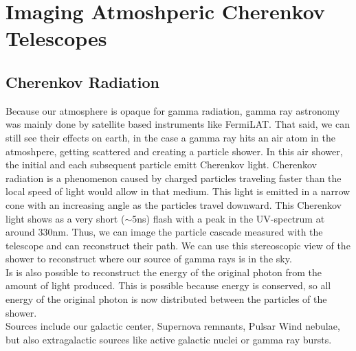 \documentclass[12pt,article,type=msc,colorback,accentcolor=tud9c]{tudthesis}
\begin{document}
\clearpage
\section{\Large Imaging Atmoshperic Cherenkov Telescopes}
\subsection{Cherenkov Radiation}

\begin{wrapfigure}{R}{0.4\textwidth}
\centering
\texttt{[image: D:/OwnCloudData/00\_WriteUP/04\_Thesis/Pic/Proposal/Fig/\{gamma]}.jpg}
\caption{\label{fig:Cherenkov} The cone of Cherenkov light emitted by an extensive air shower}
\end{wrapfigure}

Because  our atmosphere is opaque for gamma radiation, gamma ray astronomy was mainly done by satellite based instruments like FermiLAT.
That said, we can still see their effects on earth, in the case a gamma ray hits an air atom in the atmoshpere, getting scattered and creating a particle shower. In this air shower, the initial and each subsequent particle emitt Cherenkov light. Cherenkov radiation is a phenomenon caused by charged particles traveling faster than the local speed of light would allow in that medium. This light is emitted in a narrow cone with an increasing angle as the particles travel downward. This Cherenkov light shows as a very short ($\sim$5ns) flash with a peak in the UV-spectrum at around 330nm.
Thus, we can image the particle cascade measured with the telescope and can reconstruct their path.
We can use this stereoscopic view of the shower to reconstruct where our source of gamma rays is in the sky.\\

Is is also possible to reconstruct the energy of the original photon from the amount of light produced. This is possible because energy is conserved, so all energy of the original photon is now distributed between the particles of the shower.\\

Sources include our galactic center, Supernova remnants, Pulsar Wind nebulae,  but also extragalactic sources like active galactic nuclei or gamma ray bursts.\\
\end{document}
